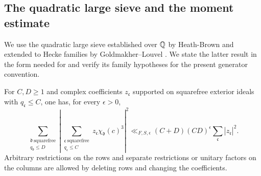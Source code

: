 \subsection{The quadratic large sieve and the moment estimate}

We use the quadratic large sieve established over \(\mathbb{Q}\) by Heath-Brown
and extended to Hecke families by Goldmakher--Louvel
\cite{HeathBrown95,GoldmakherLouvel13}.  We state the latter result in the
form needed for  and verify its family
hypotheses for the present generator convention.

\begin{lemma}
\label{lem:reflection-quadratic-sieve}
For $C,D\geq1$ and complex coefficients $z_{\mathfrak c}$ supported on
squarefree exterior ideals with $q_{\mathfrak c}\leq C$, one has, for every
$\epsilon>0$,
\begin{equation}\label{eq:reflection-quadratic-sieve}
 \sum_{\substack{\mathfrak d\ \mathrm{squarefree}\\q_{\mathfrak d}\leq D}}
   \left|\sum_{\substack{\mathfrak c\ \mathrm{squarefree}\\q_{\mathfrak c}\leq C}}
       z_{\mathfrak c}\chi_{\mathfrak d}(c)^3\right|^2
 \ll_{F,S,\epsilon}(C+D)(CD)^\epsilon
             \sum_{\mathfrak c}|z_{\mathfrak c}|^2.
\end{equation}
Arbitrary restrictions on the rows and separate restrictions or unitary
factors on the columns are allowed by deleting rows and changing the
coefficients.
\end{lemma}

